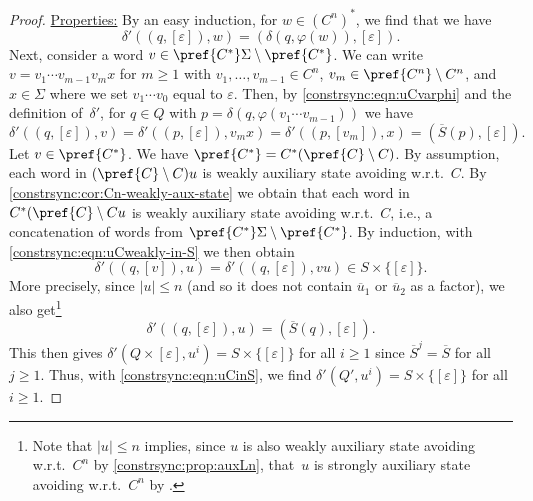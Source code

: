 \begin{proof}
	\medskip
	\noindent\underline{Properties:} By an easy induction, for $w \in (C^n)^*$, we find that we have
	\begin{equation} \label{constrsync:eqn:uCvarphi}
		\delta'((q, [\varepsilon]), w) = (\delta(q, \varphi(w)), [\varepsilon]).
	\end{equation}
	Next, consider a word $v \in \pref{C^*} \Sigma \setminus \pref{C^*}$.
	We can write $v = v_1 \cdots v_{m-1} v_m x$ for $m \ge 1$
	with $v_1,\ldots, v_{m-1} \in C^n$, $v_m \in \pref{C^n}\setminus C^n$,
	and $x \in \Sigma$
	where we set $v_1 \cdots v_{0}$ 
	equal to $\varepsilon$.
	Then, by \cref{constrsync:eqn:uCvarphi} and the definition of~$\delta'$,
	for $q \in Q$ with $p = \delta(q, \varphi(v_1 \cdots v_{m-1}))$ 
	we have
	\begin{equation}\label{constrsync:eqn:uCweakly-in-S}
	\delta'((q, [\varepsilon]), v) 
	= \delta'((p, [\varepsilon]), v_m x) 
	= \delta'((p, [v_m]), x) 
	= (\overline{S}(p), [\varepsilon]).
	\end{equation}
	Let $v \in \pref{C^*}$. 
	We have $\pref{C^*} = C^* (\pref{C}\setminus C)$.
	By assumption, each word in $(\pref{C}\setminus C )u$
	is weakly auxiliary state avoiding w.r.t.~$C$.
	By \cref{constrsync:cor:Cn-weakly-aux-state} 
	we obtain that each word in
	$C^* (\pref{C}\setminus Cu$ is weakly auxiliary state avoiding w.r.t.~$C$,
	i.e.,  a concatenation of words from $\pref{C^*}\Sigma\setminus \pref{C^*}$.
	By induction, with \cref{constrsync:eqn:uCweakly-in-S} we then obtain 
	\begin{equation} \label{constrsync:eqn:uCinS}
		\delta'((q, [v]), u) = \delta'((q, [\varepsilon]), vu) \in S \times \{[\varepsilon]\}.
	\end{equation}
	More precisely, since $|u| \le n$ (and so it does not contain $\overline{u}_1$ or $\overline{u}_2$
	as a factor), we also get\footnote{Note that $|u| \le n$ implies, since $u$ is also weakly auxiliary state avoiding w.r.t.~$C^n$
		by \cref{constrsync:prop:auxLn}, that~$u$ is strongly auxiliary state avoiding w.r.t.~$C^n$
		by .}
	\begin{equation} \label{constrsync:eqn:uContoS}
		\delta'((q, [\varepsilon]), u)  = (\overline{S}(q), [\varepsilon]).
	\end{equation}
	This then gives $\delta'(Q \times [\varepsilon], u^i) = S \times \{[\varepsilon]\}$
	for all $i \ge 1$ 
	since $\overline{S}^j = \overline{S}$ for all $j \ge 1$.
	Thus, with \cref{constrsync:eqn:uCinS},
	we find $\delta'(Q', u^i) = S \times \{[\varepsilon]\}$ for all $i \ge 1$.
			

\end{proof}
